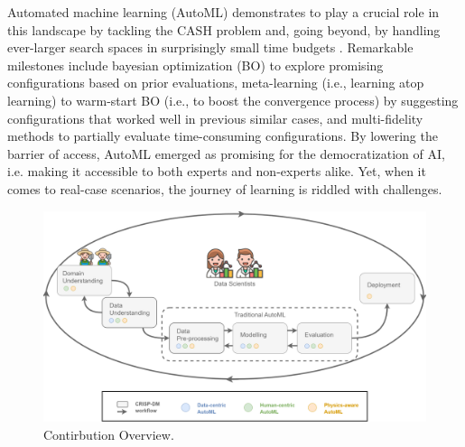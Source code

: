 Automated machine learning (AutoML) demonstrates to play a crucial role in this landscape by tackling the CASH problem and, going beyond, by handling ever-larger search spaces in surprisingly small time budgets \cite{small_time_budgets}.
Remarkable milestones include bayesian optimization (BO) to explore promising configurations based on prior evaluations,
meta-learning (i.e., learning atop learning) to warm-start BO (i.e., to boost the convergence process) by suggesting configurations that worked well in previous similar cases, and multi-fidelity methods to partially evaluate time-consuming configurations.
By lowering the barrier of access, AutoML emerged as promising for the democratization of AI, i.e. making it accessible to both experts and non-experts alike.
Yet, when it comes to real-case scenarios, the journey of learning is riddled with challenges.

\begin{figure}
    \centering
    \includegraphics[scale=0.3]{chapters/chapter-introduction/img/contribution_overview.png}
    \caption{Contirbution Overview.}
    \label{fig:contribution}
\end{figure}

